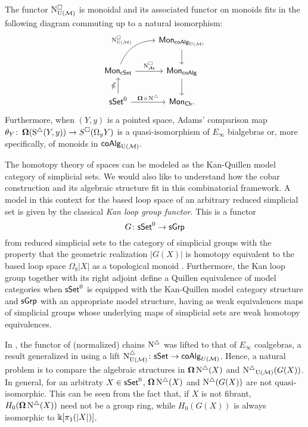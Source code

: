 \begin{theorem} \label{t:1st main thm in the intro}
	The functor $\operatorname{N^{\square}_{{\operatorname{U}(\mathcal{M})}}}$ is monoidal and its associated functor on monoids fits in the following diagram commuting up to a natural isomorphism:
	\begin{equation*}
	\begin{tikzcd}
	& \Mon_{\coAlg_\UM} \arrow[d] \\
	\Mon_{\cSet} \arrow[ru, "\cchainsUM", out=70, in=180] \arrow[r, "\cchainsAS"]
	& \Mon_{\coAlg} \arrow[d] \\
	\sSet^0 \arrow[r, "\cobar \circ \schains"] \arrow[u, "\ccobar"]
	& \Mon_{\Ch}.
	\end{tikzcd}
	\end{equation*}
	Furthermore, when $(Y, y)$ is a pointed space, Adams' comparison map $\theta_Y \colon \operatorname{\mathbf{\Omega}}(\operatorname{S^{\triangle}}(Y, y)) \to S^{\square}(\Omega_y Y)$ is a quasi-isomorphism of $E_\infty$ bialgebras or, more specifically, of monoids in $\mathsf{coAlg}_{\operatorname{U}(\mathcal{M})}$.
\end{theorem} 
The homotopy theory of spaces can be modeled as the Kan-Quillen model category of simplicial sets. We would also like to understand how the cobar construction and its algebraic structure fit in this combinatorial framework.
A model in this context for the based loop space of an arbitrary reduced simplicial set is given by the classical \textit{Kan loop group functor}.
This is a functor 
\begin{equation*}
G\colon \mathsf{sSet}^0 \to \mathsf{sGrp}
\end{equation*}
from reduced simplicial sets to the category of simplicial groups with the property that the geometric realization $|G(X)|$ is homotopy equivalent to the based loop space $\Omega_b|X|$ as a topological monoid \cite{berger1995loops}.
Furthermore, the Kan loop group together with its right adjoint define a Quillen equivalence of model categories when $\mathsf{sSet}^0$ is equipped with the Kan-Quillen model category structure and $\mathsf{sGrp}$ with an appropriate model structure, having as weak equivalences maps of simplicial groups whose underlying maps of simplicial sets are weak homotopy equivalences. 

In \cite{mcclure2003multivariable, berger2004combinatorial}, the functor of (normalized) chains $\operatorname{N^{\triangle}}$ was lifted to that of $E_\infty$ coalgebras, a result generalized in \cite{medina2020prop1} using a lift $\operatorname{N^{\triangle}_{{\operatorname{U}(\mathcal{M})}}} \colon \mathsf{sSet} \to \mathsf{coAlg}_{U(\mathcal{M})}$.
Hence, a natural problem is to compare the algebraic structures in $\operatorname{\mathbf{\Omega}} \operatorname{N^{\triangle}}(X)$ and $\operatorname{N^{\triangle}}_{{\operatorname{U}(\mathcal{M})}}(G(X))$. In general, for an arbitraty $X \in \mathsf{sSet}^0$, $\operatorname{\mathbf{\Omega}} \operatorname{N^{\triangle}}(X)$ and $\operatorname{N^{\triangle}}(G(X))$ are not quasi-isomorphic.
This can be seen from the fact that, if $X$ is not fibrant, $H_0(\operatorname{\mathbf{\Omega}} \operatorname{N^{\triangle}}(X))$ need not be a group ring, while $H_0(G(X))$ is always isomorphic to $ \Bbbk[\pi_1(|X|)]$.


